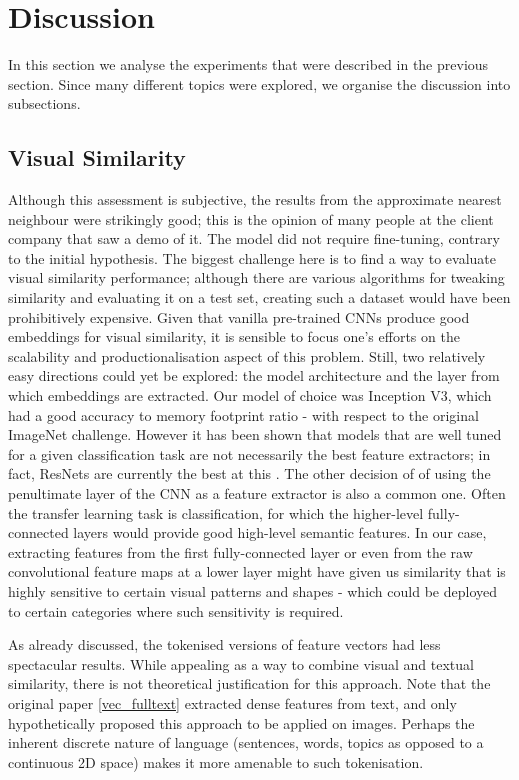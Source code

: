 \chapter{Discussion}

In this section we analyse the experiments that were described in the previous section.
Since many different topics were explored, we organise the discussion into subsections.

\section{Visual Similarity}

Although this assessment is subjective, the results from the approximate nearest neighbour were strikingly good; this is the opinion of many people at the client company that saw a demo of it.
The model did not require fine-tuning, contrary to the initial hypothesis.
The biggest challenge here is to find a way to evaluate visual similarity performance; although there are various algorithms for tweaking similarity and evaluating it on a test set, creating such a dataset would have been prohibitively expensive.
Given that vanilla pre-trained CNNs produce good embeddings for visual similarity, it is sensible to focus one's efforts on the scalability and productionalisation aspect of this problem.
Still, two relatively easy directions could yet be explored: the model architecture and the layer from which embeddings are extracted.
Our model of choice was Inception V3, which had a good accuracy to memory footprint ratio - with respect to the original ImageNet challenge.
However it has been shown that models that are well tuned for a given classification task are not necessarily the best feature extractors; in fact, ResNets are currently the best at this \cite{img_feature_extract}.
The other decision of of using the penultimate layer of the CNN as a feature extractor is also a common one.
Often the transfer learning task is classification, for which the higher-level fully-connected layers would provide good high-level semantic features.
In our case, extracting features from the first fully-connected layer or even from the raw convolutional feature maps at a lower layer might have given us similarity that is highly sensitive to certain visual patterns and shapes - which could be deployed to certain categories where such sensitivity is required.

As already discussed, the tokenised versions of feature vectors had less spectacular results.
While appealing as a way to combine visual and textual similarity, there is not theoretical justification for this approach.
Note that the original paper \ref{vec_fulltext} extracted dense features from text, and only hypothetically proposed this approach to be applied on images.
Perhaps the inherent discrete nature of language (sentences, words, topics as opposed to a continuous 2D space)  makes it more amenable to such tokenisation.

